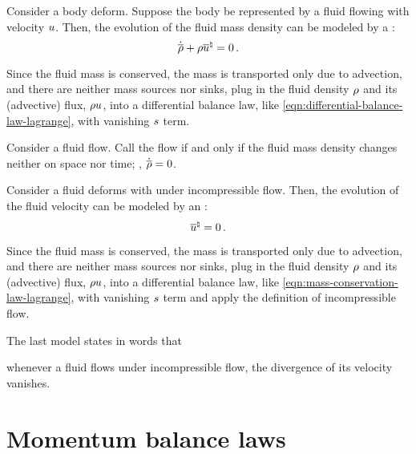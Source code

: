 \begin{model}
  Consider a body deform. Suppose the body be represented by a fluid flowing with velocity $u$. Then, the evolution of the fluid mass density can be modeled by a :
  \begin{equation}\label{eqn:mass-conservation-law-lagrange}
    \dot{\overline{\rho}} + \rho{\overline{u}}^{\natural} = 0\,.
  \end{equation}
\end{model}
%
\begin{argument}
  Since the fluid mass is conserved, the mass is transported only due to advection, and there are neither mass sources nor sinks, plug in the fluid density $\rho$ and its (advective) flux, $\rho u$, into a differential balance law, like \cref{eqn:differential-balance-law-lagrange}, with vanishing $s$ term.
\end{argument}

\begin{definition}
  Consider a fluid flow. Call the flow  if and only if the fluid mass density changes neither on space nor time; \ie, $\dot{\overline{\rho}} = 0$.
\end{definition}

\begin{model}
  Consider a fluid deforms with under incompressible flow. Then, the evolution of the fluid velocity can be modeled by an :
  \begin{equation}\label{eqn:incompressible-flow-equation}
    {\overline{u}}^{\natural} = 0\,.
  \end{equation}
\end{model}
%
\begin{argument}
  Since the fluid mass is conserved, the mass is transported only due to advection, and there are neither mass sources nor sinks, plug in the fluid density $\rho$ and its (advective) flux, $\rho u$, into a differential balance law, like \cref{eqn:mass-conservation-law-lagrange}, with vanishing $s$ term and apply the definition of incompressible flow.
\end{argument}
%
The last model states in words that
%
\begin{law}
  whenever a fluid flows under incompressible flow, the divergence of its velocity vanishes.
\end{law}


\section{Momentum balance laws}
\label{sec:momentum-balance-laws}

